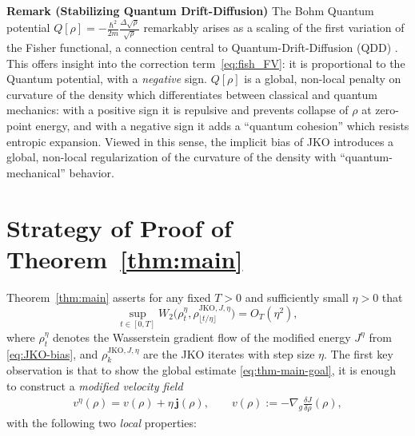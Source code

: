 \documentclass[reqno,11pt,letterpaper]{amsart}
\theoremstyle{plain}
\theoremstyle{definition}
\theoremstyle{remark}
\begin{document}
\textbf{Remark (Stabilizing Quantum Drift-Diffusion)}\label{rem:JKO_Quantum} The Bohm Quantum potential $Q[\rho]=-\frac{\hbar^{2}}{2m}\frac{\Delta \sqrt{ \rho}}{\sqrt{\rho}}$ remarkably arises as a scaling of the first variation of the Fisher functional, a connection central to Quantum-Drift-Diffusion (QDD) \cite{Gianazza2008}. This offers insight into the correction term~\eqref{eq:fish_FV}: it is proportional to the Quantum potential, with a \emph{negative} sign. $Q[\rho]$ is a global, non-local penalty on curvature of the density which differentiates between classical and quantum mechanics: with a positive sign it is repulsive and prevents collapse of $\rho$ at zero-point energy, and with a negative sign it adds a ``quantum cohesion'' which resists entropic expansion. Viewed in this sense, the implicit bias of JKO introduces a global, non-local regularization of the curvature of the density with ``quantum-mechanical'' behavior.

\section{Strategy of Proof of Theorem~\ref{thm:main}}\label{sec:Theoretical_Res}

Theorem~\ref{thm:main} asserts for any fixed $T>0$ and sufficiently small $\eta>0$ that
\begin{equation}\label{eq:thm-main-goal}
\sup_{t\in[0,T]} W_2\big(\rho_t^\eta,\rho_{\lfloor t/\eta\rfloor}^{\mathrm{JKO},J,\eta}\big)
= O_T(\eta^2),    
\end{equation}
where $\rho_t^\eta$ denotes the Wasserstein gradient flow of the modified energy $J^\eta$ from \eqref{eq:JKO-bias}, and $\rho_k^{\mathrm{JKO},J,\eta}$ are the JKO iterates with step size $\eta$. The first key observation is that to show the global estimate \eqref{eq:thm-main-goal}, it is enough to construct a \emph{modified velocity field}
\begin{align}\label{eq:JKO_vf_ansatz}
v^\eta(\rho) = v(\rho) + \eta\,\bm j(\rho),
\qquad
v(\rho) := -\nabla_g \frac{\delta J}{\delta \rho}(\rho),
\end{align}
with the following two \textit{local} properties:
\end{document}
